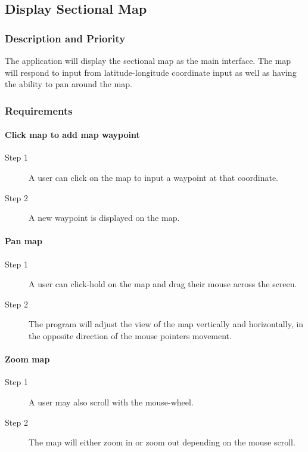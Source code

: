 \documentclass[12pt, letterpaper]{article}
\begin{document}
  \subsection{Display Sectional Map}
    \subsubsection{Description and Priority}
      The application will display the sectional map as the main interface.
      The map will respond to input from latitude-longitude coordinate input as well
      as having the ability to pan around the map.
    \subsubsection{Requirements}
    \paragraph{Click map to add map waypoint}
      \begin{description}

        \item[Step 1] A user can click on the map to input a waypoint at that coordinate.
        \item[Step 2] A new waypoint is displayed on the map.
      \end{description}
          \paragraph{Pan map}
          \begin{description}
        \item[Step 1] A user can click-hold on the map and drag their mouse across the screen.
        \item[Step 2] The program will adjust the view of the map vertically and horizontally,
			                  in the opposite direction of the mouse pointers movement.
        \end{description}
        \paragraph{Zoom map}
        \begin{description}
        \item[Step 1] A user may also scroll with the mouse-wheel.
        \item[Step 2] The map will either zoom in or zoom out depending on the mouse scroll.
      \end{description}
\end{document}
